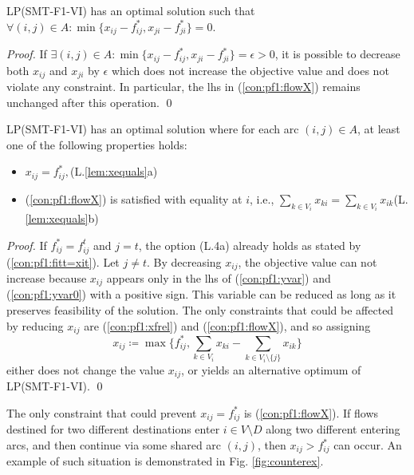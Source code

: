 \begin{lemma}\label{lem:oneslack} LP(SMT-F1-VI) has an optimal solution such that \newline
$\forall (i,j)\in A: \min\{x_{ij} - f^*_{ij}, x_{ji}-f^*_{ji}\}=0$.
\end{lemma}
\begin{proof}
If $\exists (i,j)\in A: \min\{x_{ij} - f^*_{ij}, x_{ji}-f^*_{ji}\}=\epsilon>0$, it is possible to decrease both $x_{ij}$ and $x_{ji}$ by $\epsilon$ which does not increase the objective value and does not violate any constraint. In particular, the lhs in (\ref{con:pf1:flowX}) remains unchanged after this operation.  \qed
\end{proof}
\begin{lemma}\label{lem:xequals} LP(SMT-F1-VI) has an optimal solution where for each arc $(i,j)\in A$, at least one of the following properties holds:

\begin{itemize}
\item\label{lem:item:noslack} $x_{ij}=f^*_{ij},$\hfill(L.\ref{lem:xequals}a)
\item\label{lem:item:slack} %
(\ref{con:pf1:flowX}) is satisfied with equality at $i$, i.e., $\sum_{k\in V_{i}}x_{ki}=\sum_{k\in V_i}x_{ik}$\hfill(L.\ref{lem:xequals}b)
\end{itemize}

\end{lemma}
\begin{proof}
If $f^*_{ij}=f^t_{ij}$ and $j=t$, the option (L.4a) already holds as stated by (\ref{con:pf1:fitt=xit}). Let $j\neq t$. By decreasing $x_{ij}$, the objective value can not increase because $x_{ij}$ appears only in the lhs of (\ref{con:pf1:yvar}) and (\ref{con:pf1:yvar0}) with a positive sign. This variable can be reduced as long as it preserves feasibility of the solution. The only constraints that could be affected by reducing $x_{ij}$ are (\ref{con:pf1:xfrel}) and (\ref{con:pf1:flowX}), and so assigning 
$$x_{ij}\coloneqq\max\bigg\{ f^*_{ij},\sum_{k\in V_i}x_{ki}-\sum_{k\in V_i\setminus\{j\}}x_{ik}\bigg\}$$
either does not change the value $x_{ij}$, or yields an alternative optimum of LP(SMT-F1-VI). \qed
\end{proof}
The only constraint that could prevent $x_{ij}=f^*_{ij}$ is (\ref{con:pf1:flowX}). If flows destined for two different destinations enter $i\in V\setminus D$ along two different entering arcs, and then continue via some shared arc $(i,j)$, then $x_{ij}>f^*_{ij}$ can occur. An example of such situation is demonstrated in Fig. \ref{fig:counterex}.
